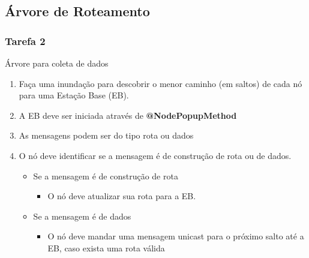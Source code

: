 \documentclass{beamer}
\begin{document}
\subsection{Árvore de Roteamento} %
\begin{frame}
	\frametitle{Tarefa 2}
	\small
	\begin{alertblock}{Árvore para coleta de dados}
		\begin{enumerate}
			\item Faça uma inundação para descobrir o menor caminho (em saltos) de cada nó para uma Estação Base (EB).
			\item A EB deve ser iniciada através de \textbf{@NodePopupMethod}
			\item As mensagens podem ser do tipo rota ou dados
			\item O nó deve identificar se a mensagem é de construção de rota ou de dados.
			\begin{itemize}
				\item Se a mensagem é de construção de rota
				\begin{itemize}
					\item O nó deve atualizar sua rota para a EB.
				\end{itemize}
				\item Se a mensagem é de dados
				\begin{itemize}
					\item O nó deve mandar uma mensagem unicast para o próximo salto até a EB, caso exista uma rota válida
				\end{itemize}
			\end{itemize}

		\end{enumerate}
	\end{alertblock}
\end{frame}
\end{document}
